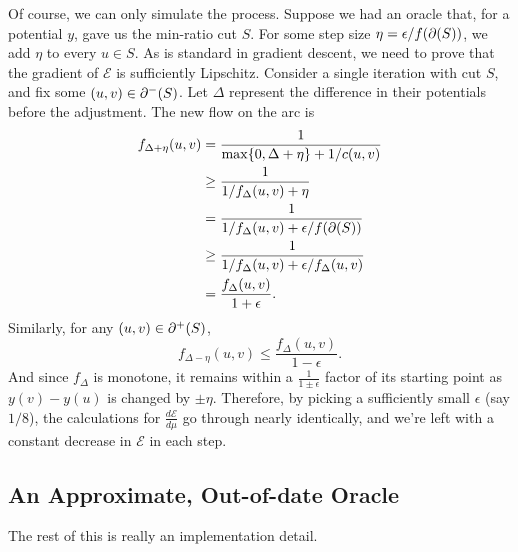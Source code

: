 \documentclass[12pt]{article}
\begin{document}
Of course, we can only simulate the process. Suppose we had an oracle that, for
a potential $y$, gave us the min-ratio cut $S$. For some step size
$\eta = \epsilon/f(\cut{S})$, we add $\eta$ to every $u \in S$. As is standard
in gradient descent, we need to prove that the gradient of $\mathcal{E}$ is
sufficiently Lipschitz. Consider a single iteration with cut $S$, and fix some
$(u, v) \in \incut S$. Let $\Delta$ represent the difference in their potentials
before the adjustment. The new flow on the arc is
\begin{align*}
  f_{\Delta+\eta}(u, v) & = \frac{1}{\max\Set{0, \Delta + \eta} + 1/c(u, v)}        \\
                        & \geq \frac{1}{1/f_\Delta(u, v) + \eta}                    \\
                        & = \frac{1}{1/f_\Delta(u, v) + \epsilon/f(\cut{S})}        \\
                        & \geq \frac{1}{1/f_\Delta(u, v) + \epsilon/f_\Delta(u, v)} \\
                        & = \frac{f_\Delta(u, v)}{1 + \epsilon}.
\end{align*}
Similarly, for any $(u, v) \in \outcut{S}$,
\[
  f_{\Delta-\eta}(u, v) \leq \frac{f_\Delta(u, v)}{1 - \epsilon}.
\]
And since $f_\Delta$ is monotone, it remains within a $\frac{1}{1 \pm \epsilon}$
factor of its starting point as $y(v) - y(u)$ is changed by $\pm \eta$.
Therefore, by picking a sufficiently small $\epsilon$ (say $1/8$), the
calculations for $\frac{d\mathcal{E}}{d\mu}$ go through nearly identically, and
we're left with a constant decrease in $\mathcal{E}$ in each step.

\subsection{An Approximate, Out-of-date Oracle}

The rest of this is really an implementation detail.
\end{document}
